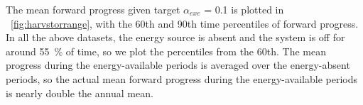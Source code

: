
 The mean forward progress given target $\alpha_{exe}$ = 0.1 is plotted in \figurename{~\ref{fig:harvstorrange}}, with the 60th and 90th time percentiles of forward progress. In all the  above datasets, the energy source is absent and the system is off for around \SI{55}{\percent} of time, so we plot the percentiles from the 60th. The mean progress during the energy-available periods is averaged over the energy-absent periods, so the actual mean forward progress during the energy-available periods is nearly double the annual mean. 


